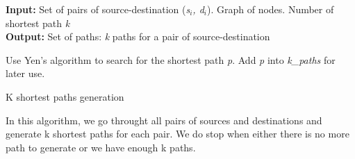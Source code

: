 \begin{algorithm}[!htbp]
\textbf{Input:} Set of pairs of source-destination (\textit{s$_i$, d$_i$}). Graph of nodes. Number of shortest path \textit{k}\\
\textbf{Output:} Set of paths: \textit{k} paths for a pair of source-destination\\
\begin{algorithmic}
	\State Use Yen's algorithm to search for the shortest path \textit{p}.
        \State Add \textit{p} into \textit{k\_paths} for later use.
    \EndWhile
\EndFor
\end{algorithmic}

\caption{K shortest paths generation}
\label{alg:h1}

\end{algorithm}

In this algorithm, we go throught all pairs of sources and destinations and generate k shortest paths for each pair. We do stop when either there is no more path to generate or we have enough k paths.

